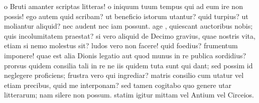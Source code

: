


 o Bruti amanter scriptas litteras! o iniquum tuum tempus qui ad eum ire non possis! ego autem quid scribam? ut beneficio istorum utantur? quid turpius? ut moliantur aliquid? nec audent nec iam possunt. age , quiescant auctoribus nobis; quis incolumitatem praestat? si vero aliquid de Decimo gravius, quae nostris vita, etiam si nemo molestus sit? ludos vero non facere! quid foedius? frumentum imponere! quae est alia Dionis legatio aut quod munus in re publica sordidius? prorsus quidem consilia tali in re ne iis quidem tuta sunt qui dant; sed possim id neglegere proficiens; frustra vero qui ingrediar? matris consilio cum utatur vel etiam precibus, quid me interponam? sed tamen cogitabo quo genere utar litterarum; nam silere non possum. statim igitur mittam vel Antium vel Circeios.

